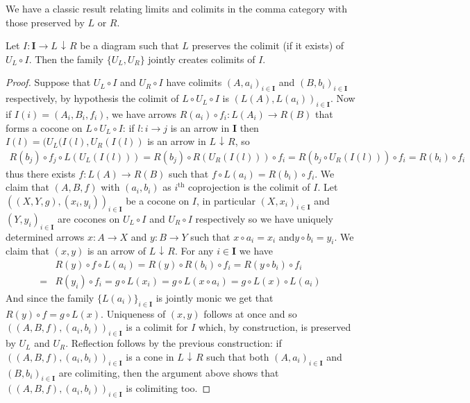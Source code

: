 \documentclass[runningheads,envcountsect]{lmcs}
\newcommand{\catname}[1]{\mathbf{#1}}
\newcommand{\comma}[2]{#1\hspace{1pt} {\downarrow}\hspace{1pt} #2}
\theoremstyle{plain}
\theoremstyle{definition}
\begin{document}
We have a classic result relating limits and colimits in the comma category with those preserved by $L$ or $R$.

\begin{lem}\label{colim}
	Let $I:\catname{I}\rightarrow \comma{L}{R}$ be a diagram such that $L$ preserves the colimit (if it exists) of $U_L\circ I$. Then the family $\{U_L, U_R\}$ jointly creates colimits of $I$.
\end{lem}
\begin{proof}
		Suppose that $U_L\circ I$ and $U_R\circ I$ have colimits  $(A, a_i)_{i\in \catname{I}}$ and $(B, b_i)_{i\in \catname{I}}$ respectively, by hypothesis the colimit of $L\circ U_L\circ I$ is $(L(A), L(a_i))_{i\in \catname{I}}$. Now if $I(i)=(A_i, B_i, f_i)$, we have arrows $R(a_i)\circ f_i:L(A_i)\rightarrow R(B)$ that forms a cocone on $L\circ U_L\circ I$: if $l:i\rightarrow j$ is an arrow in $\catname{I}$ then $I(l)=(U_L(I(l), U_R(I(l))$ is an arrow in $\comma{L}{R}$, so
		\begin{align*}
		R(b_j)\circ f_j\circ L(U_L(I(l)))=R(b_j)\circ R(U_R(I(l)))\circ f_i=R(b_j\circ U_R(I(l)))\circ f_i=R(b_i)\circ f_i
		\end{align*}
		thus there exists $f:L(A)\rightarrow R(B)$ such that $f\circ L(a_i)=R(b_i)\circ f_i$. We claim that $(A, B, f)$ with $(a_i, b_i)$ as $i^\text{th}$ coprojection is the colimit of $I$. Let $((X, Y, g), (x_i, y_i))_{i\in \catname{I}}$ be a cocone on $I$, in particular $(X, x_i)_{i\in \catname{I}}$ and $(Y, y_i)_{i\in \catname{I}}$ are cocones on $U_L\circ I$ and $U_R\circ I$ respectively so we have uniquely determined arrows $x:A\rightarrow X$ and $y:B\rightarrow Y$ such that 
		$x\circ a_i=x_i$ and$y\circ b_i=y_i$. We claim that $(x,y)$ is an arrow of $\comma{L}{R}$. For any $i\in \catname{I}$ we have
		\begin{align*}
		&R(y)\circ f\circ L(a_i)=R(y)\circ R(b_i)\circ f_i=R(y\circ b_i)\circ f_i\\=&R(y_i)\circ f_i= g\circ L(x_i)=g\circ L(x\circ a_i)=g\circ L(x)\circ L(a_i)
		\end{align*}
		And since the family $\{L(a_i)\}_{i\in \catname{I}}$ is jointly monic we get that $R(y)\circ f=g\circ L(x)$.		Uniqueness of $(x,y)$ follows at once and so $((A, B, f), (a_i, b_i))_{i \in \catname{I}}$ is a colimit for $I$ which, by construction, is preserved by $U_L$ and $U_R$. Reflection follows by the previous construction: if $((A, B, f), (a_i, b_i))_{i\in \catname{I}}$ is a cone in $\comma{L}{R}$ such that both $(A, a_i)_{i\in \catname{I}}$ and $(B, b_i)_{i\in \catname{I}}$ are colimiting, then the argument above shows that $((A, B, f), (a_i, b_i))_{i\in \catname{I}}$ is colimiting too.
\end{proof} 
\end{document}
